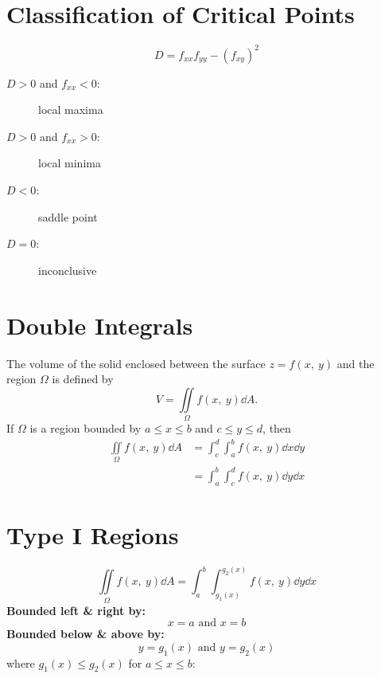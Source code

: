 \documentclass{article}
\begin{document}
\begin{multicols}{3}
    \section*{Classification of Critical Points}
    \begin{equation*}
        D = f_{xx}f_{yy} - \left( f_{xy} \right)^2
    \end{equation*}
    \begin{description}
        \item[$D > 0$ and $f_{xx} < 0$:] local maxima
        \item[$D > 0$ and $f_{xx} > 0$:] local minima
        \item[$D < 0$:] saddle point
        \item[$D = 0$:] inconclusive
    \end{description}
    \section*{Double Integrals}
    The volume of the solid
    enclosed between the surface $z=f(x,\: y)$ and the region $\Omega$ is
    defined by
    \begin{equation*}
        V = \iint\limits_{\Omega} f(x,\: y) \dd{A}.
    \end{equation*}
    If $\Omega$ is a region bounded by $a \leq x \leq b$ and $c \leq y \leq d$, then
    \begin{align*}
        \iint\limits_{\Omega} f(x,\: y) \dd{A} & = \int_c^d\int_a^b f(x,\: y) \dd{x} \dd{y} \\
                                               & = \int_a^b\int_c^d f(x,\: y) \dd{y} \dd{x}
    \end{align*}
    \section*{Type I Regions}
    \begin{equation*}
        \iint\limits_{\Omega} f(x,\: y) \dd{A} = \int_a^b\int_{g_1(x)}^{g_2(x)} f(x,\: y) \dd{y} \dd{x}
    \end{equation*}
    \textbf{Bounded left \& right by:}
    \begin{equation*}
        x=a \text{ and } x=b
    \end{equation*}
    \textbf{Bounded below \& above by:}
    \begin{equation*}
        y=g_1(x) \text{ and } y=g_2(x)
    \end{equation*}
    where $g_1(x) \leq g_2(x)$ for $a \leq x \leq b$:

\end{multicols}
\end{document}
